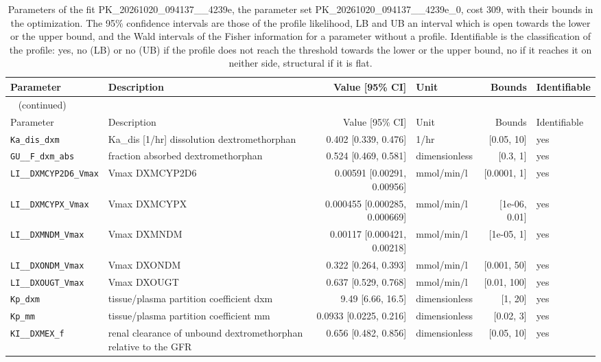 \begin{longtable}{llrlrl}
\caption{Parameters of the fit PK\_20261020\_094137\_\_4239e, the parameter set PK\_20261020\_094137\_\_4239e\_0, cost 309, with their bounds in the optimization. The 95\% confidence intervals are those of the profile likelihood, LB and UB an interval which is open towards the lower or the upper bound, and the Wald intervals of the Fisher information for a parameter without a profile. Identifiable is the classification of the profile: yes, no (LB) or no (UB) if the profile does not reach the threshold towards the lower or the upper bound, no if it reaches it on neither side, structural if it is flat.}\label{tab:parameters:PK_20261020_094137__4239e} \\
\toprule
Parameter & Description & Value [95\% CI] & Unit & Bounds & Identifiable \\
\midrule
\endfirsthead
\multicolumn{6}{l}{\small\tablename~\thetable{} (continued)} \\
\toprule
Parameter & Description & Value [95\% CI] & Unit & Bounds & Identifiable \\
\midrule
\endhead
\bottomrule
\endlastfoot
\texttt{Ka\_dis\_dxm} & Ka\_dis [1/hr] dissolution dextromethorphan & 0.402 [0.339, 0.476] & 1/hr & [0.05, 10] & yes \\
\texttt{GU\_\_F\_dxm\_abs} & fraction absorbed dextromethorphan & 0.524 [0.469, 0.581] & dimensionless & [0.3, 1] & yes \\
\texttt{LI\_\_DXMCYP2D6\_Vmax} & Vmax DXMCYP2D6 & 0.00591 [0.00291, 0.00956] & mmol/min/l & [0.0001, 1] & yes \\
\texttt{LI\_\_DXMCYPX\_Vmax} & Vmax DXMCYPX & 0.000455 [0.000285, 0.000669] & mmol/min/l & [1e-06, 0.01] & yes \\
\texttt{LI\_\_DXMNDM\_Vmax} & Vmax DXMNDM & 0.00117 [0.000421, 0.00218] & mmol/min/l & [1e-05, 1] & yes \\
\texttt{LI\_\_DXONDM\_Vmax} & Vmax DXONDM & 0.322 [0.264, 0.393] & mmol/min/l & [0.001, 50] & yes \\
\texttt{LI\_\_DXOUGT\_Vmax} & Vmax DXOUGT & 0.637 [0.529, 0.768] & mmol/min/l & [0.01, 100] & yes \\
\texttt{Kp\_dxm} & tissue/plasma partition coefficient dxm & 9.49 [6.66, 16.5] & dimensionless & [1, 20] & yes \\
\texttt{Kp\_mm} & tissue/plasma partition coefficient mm & 0.0933 [0.0225, 0.216] & dimensionless & [0.02, 3] & yes \\
\texttt{KI\_\_DXMEX\_f} & renal clearance of unbound dextromethorphan relative to the GFR & 0.656 [0.482, 0.856] & dimensionless & [0.05, 10] & yes \\

\end{longtable}
